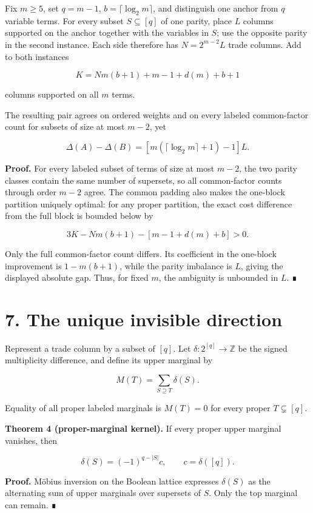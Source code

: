 \documentclass[
  11pt,
]{article}
\begin{document}
Fix \(m\ge5\), set \(q=m-1\), \(b=\lceil\log_2m\rceil\), and distinguish
one anchor from \(q\) variable terms. For every subset \(S\subseteq[q]\)
of one parity, place \(L\) columns supported on the anchor together with
the variables in \(S\); use the opposite parity in the second instance.
Each side therefore has \(N=2^{m-2}L\) trade columns. Add to both
instances

\[
K=Nm(b+1)+m-1+d(m)+b+1
\]

columns supported on all \(m\) terms.

The resulting pair agrees on ordered weights and on every labeled
common-factor count for subsets of size at most \(m-2\), yet

\[
\Delta(A)-\Delta(B)
=\left[m(\lceil\log_2m\rceil+1)-1\right]L.
\]

\textbf{Proof.} For every labeled subset of terms of size at most
\(m-2\), the two parity classes contain the same number of supersets, so
all common-factor counts through order \(m-2\) agree. The common padding
also makes the one-block partition uniquely optimal: for any proper
partition, the exact cost difference from the full block is bounded
below by

\[
3K-Nm(b+1)-[m-1+d(m)+b]>0.
\]

Only the full common-factor count differs. Its coefficient in the
one-block improvement is \(1-m(b+1)\), while the parity imbalance is
\(L\), giving the displayed absolute gap. Thus, for fixed \(m\), the
ambiguity is unbounded in \(L\). ∎

\hypertarget{the-unique-invisible-direction}{%
\section{7. The unique invisible
direction}\label{the-unique-invisible-direction}}

Represent a trade column by a subset of \([q]\). Let
\(\delta:2^{[q]}\to\mathbb Z\) be the signed multiplicity difference,
and define its upper marginal by

\[
M(T)=\sum_{S\supseteq T}\delta(S).
\]

Equality of all proper labeled marginals is \(M(T)=0\) for every proper
\(T\subsetneq[q]\).

\textbf{Theorem 4 (proper-marginal kernel).} If every proper upper
marginal vanishes, then

\[
\delta(S)=(-1)^{q-|S|}c,
\qquad c=\delta([q]).
\]

\textbf{Proof.} Möbius inversion on the Boolean lattice expresses
\(\delta(S)\) as the alternating sum of upper marginals over supersets
of \(S\). Only the top marginal can remain. ∎
\end{document}
